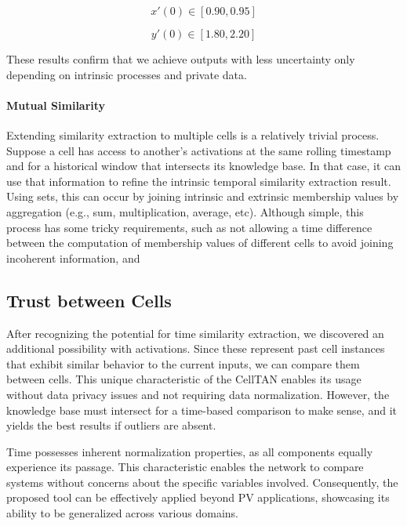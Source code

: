 \begin{equation}
    x'(0) \in [0.90, 0.95]
\end{equation}

\begin{equation}
    y'(0) \in [1.80, 2.20]
\end{equation}

These results confirm that we achieve outputs with less uncertainty only depending on intrinsic processes and private data.

\paragraph{Mutual Similarity}

Extending similarity extraction to multiple cells is a relatively trivial process. Suppose a cell has access to another's activations at the same rolling timestamp and for a historical window that intersects its knowledge base. In that case, it can use that information to refine the intrinsic temporal similarity extraction result. Using sets, this can occur by joining intrinsic and extrinsic membership values by aggregation (e.g., sum, multiplication, average, etc).
Although simple, this process has some tricky requirements, such as not allowing a time difference between the computation of membership values of different cells to avoid joining incoherent information, and 


\subsection{Trust between Cells}  \label{subsec:trust}


After recognizing the potential for time similarity extraction, we discovered an additional possibility with activations. Since these represent past cell instances that exhibit similar behavior to the current inputs, we can compare them between cells. This unique characteristic of the CellTAN enables its usage without data privacy issues and not requiring data normalization. However, the knowledge base must intersect for a time-based comparison to make sense, and it yields the best results if outliers are absent.

Time possesses inherent normalization properties, as all components equally experience its passage. This characteristic enables the network to compare systems without concerns about the specific variables involved. Consequently, the proposed tool can be effectively applied beyond PV applications, showcasing its ability to be generalized across various domains.

